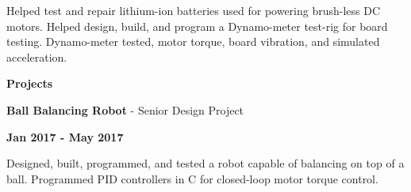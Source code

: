 \documentclass[paper=a4,fontsize=11pt]{article} %
\def \sectionSpace      {0.7cm}     %
\def \subSectionSpace   {0.3cm}     %
\def \leftColSpace      {0.12}      %
\def \middleColSpace    {0.675}     %
\def \bigMiddleColSpace {0.875}     %
\def \rightColSpace     {0.25}      %
\begin{document}
    \noindent
    \begin{minipage}[t]{\leftColSpace\linewidth}
        \hfill
    \end{minipage}
    \begin{minipage}[t]{\bigMiddleColSpace\linewidth}
        Helped test and repair lithium-ion batteries used for powering brush-less DC motors. Helped design, build, and program a Dynamo-meter test-rig for board testing. Dynamo-meter tested, motor torque, board vibration, and simulated acceleration.
    \end{minipage}

    \vspace{\sectionSpace}
    \noindent
    \begin{minipage}[t]{\leftColSpace\linewidth}
        \noindent \textbf{Projects}
    \end{minipage}
    \begin{minipage}[t]{\middleColSpace\linewidth}
        \vspace{\subSectionSpace}
        \noindent \textbf{Ball Balancing Robot } - Senior Design Project
    \end{minipage}
    \begin{minipage}[t]{\rightColSpace\linewidth}
        \begin{flushleft}
            \vspace{\subSectionSpace}
            \noindent \textbf{Jan 2017 - May 2017}
        \end{flushleft}
    \end{minipage}

    \noindent
    \begin{minipage}[t]{\leftColSpace\linewidth}
        \hfill
    \end{minipage}
    \begin{minipage}[t]{\bigMiddleColSpace\linewidth}
        Designed, built, programmed, and tested a robot capable of balancing on top of a ball. Programmed PID controllers in C for closed-loop motor torque control. 
    \end{minipage}
\end{document}
